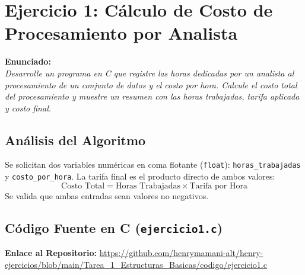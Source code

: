 \documentclass[12pt]{article}
\begin{document}
\newpage

\section*{Ejercicio 1: Cálculo de Costo de Procesamiento por Analista}

\noindent\textbf{Enunciado:}\\
\textit{Desarrolle un programa en C que registre las horas dedicadas por un analista al procesamiento de un conjunto de datos y el costo por hora. Calcule el costo total del procesamiento y muestre un resumen con las horas trabajadas, tarifa aplicada y costo final.}

\subsection*{Análisis del Algoritmo}
Se solicitan dos variables numéricas en coma flotante (\texttt{float}): \texttt{horas\_trabajadas} y \texttt{costo\_por\_hora}. La tarifa final es el producto directo de ambos valores:
\[ \text{Costo Total} = \text{Horas Trabajadas} \times \text{Tarifa por Hora} \]
Se valida que ambas entradas sean valores no negativos.

\subsection*{Código Fuente en C (\texttt{ejercicio1.c})}
\noindent\textbf{Enlace al Repositorio:} \url{https://github.com/henrymamani-alt/henry-ejercicios/blob/main/Tarea_1_Estructuras_Basicas/codigo/ejercicio1.c}
\end{document}
